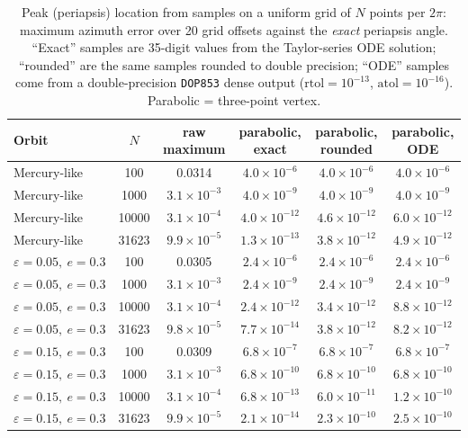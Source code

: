 \begin{table}[!htbp]
\centering
\caption{Peak (periapsis) location from samples on a uniform grid of $N$ points per $2\pi$: maximum azimuth error over 20 grid offsets against the \emph{exact} periapsis angle. ``Exact'' samples are 35-digit values from the Taylor-series ODE solution; ``rounded'' are the same samples rounded to double precision; ``ODE'' samples come from a double-precision \texttt{DOP853} dense output ($\mathrm{rtol}=10^{-13}$, $\mathrm{atol}=10^{-16}$). Parabolic = three-point vertex.}
\label{tab:interp}
\small
\begin{tabular}{lccccc}
\toprule
Orbit & $N$ & raw maximum & parabolic, exact & parabolic, rounded & parabolic, ODE \\
\midrule
Mercury-like & 100 & 0.0314 & $4.0\times10^{-6}$ & $4.0\times10^{-6}$ & $4.0\times10^{-6}$ \\
Mercury-like & 1000 & $3.1\times10^{-3}$ & $4.0\times10^{-9}$ & $4.0\times10^{-9}$ & $4.0\times10^{-9}$ \\
Mercury-like & 10000 & $3.1\times10^{-4}$ & $4.0\times10^{-12}$ & $4.6\times10^{-12}$ & $6.0\times10^{-12}$ \\
Mercury-like & 31623 & $9.9\times10^{-5}$ & $1.3\times10^{-13}$ & $3.8\times10^{-12}$ & $4.9\times10^{-12}$ \\
$\varepsilon=0.05,\ e=0.3$ & 100 & 0.0305 & $2.4\times10^{-6}$ & $2.4\times10^{-6}$ & $2.4\times10^{-6}$ \\
$\varepsilon=0.05,\ e=0.3$ & 1000 & $3.1\times10^{-3}$ & $2.4\times10^{-9}$ & $2.4\times10^{-9}$ & $2.4\times10^{-9}$ \\
$\varepsilon=0.05,\ e=0.3$ & 10000 & $3.1\times10^{-4}$ & $2.4\times10^{-12}$ & $3.4\times10^{-12}$ & $8.8\times10^{-12}$ \\
$\varepsilon=0.05,\ e=0.3$ & 31623 & $9.8\times10^{-5}$ & $7.7\times10^{-14}$ & $3.8\times10^{-12}$ & $8.2\times10^{-12}$ \\
$\varepsilon=0.15,\ e=0.3$ & 100 & 0.0309 & $6.8\times10^{-7}$ & $6.8\times10^{-7}$ & $6.8\times10^{-7}$ \\
$\varepsilon=0.15,\ e=0.3$ & 1000 & $3.1\times10^{-3}$ & $6.8\times10^{-10}$ & $6.8\times10^{-10}$ & $6.8\times10^{-10}$ \\
$\varepsilon=0.15,\ e=0.3$ & 10000 & $3.1\times10^{-4}$ & $6.8\times10^{-13}$ & $6.0\times10^{-11}$ & $1.2\times10^{-10}$ \\
$\varepsilon=0.15,\ e=0.3$ & 31623 & $9.9\times10^{-5}$ & $2.1\times10^{-14}$ & $2.3\times10^{-10}$ & $2.5\times10^{-10}$ \\
\bottomrule
\end{tabular}
\end{table}

